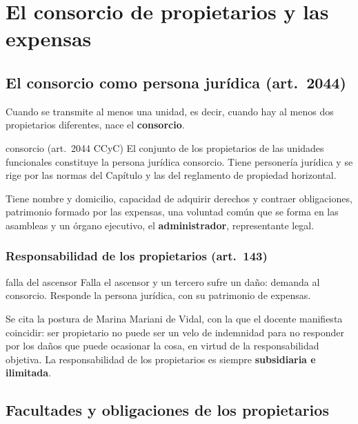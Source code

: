 \documentclass[12pt,oneside]{book}
\begin{document}
\chapter[El consorcio y las expensas]{El consorcio de propietarios y las expensas}\label{cap:consorcio}

\section{El consorcio como persona jurídica (art.~2044)}

Cuando se transmite al menos una unidad, es decir, cuando hay al menos dos propietarios diferentes, nace el \textbf{consorcio}.

\begin{definicion}{consorcio (art.~2044 CCyC)}
El conjunto de los propietarios de las unidades funcionales constituye la persona jurídica consorcio. Tiene personería jurídica y se rige por las normas del Capítulo y las del reglamento de propiedad horizontal.
\end{definicion}

Tiene nombre y domicilio, capacidad de adquirir derechos y contraer obligaciones, patrimonio formado por las expensas, una voluntad común que se forma en las asambleas y un órgano ejecutivo, el \textbf{administrador}, representante legal.

\subsection{Responsabilidad de los propietarios (art.~143)}

\begin{ejemplo}{falla del ascensor}
Falla el ascensor y un tercero sufre un daño: demanda al consorcio. Responde la persona jurídica, con su patrimonio de expensas.
\end{ejemplo}

Se cita la postura de Marina Mariani de Vidal, con la que el docente manifiesta coincidir: ser propietario no puede ser un velo de indemnidad para no responder por los daños que puede ocasionar la cosa, en virtud de la responsabilidad objetiva. La responsabilidad de los propietarios es siempre \textbf{subsidiaria e ilimitada}.

\section{Facultades y obligaciones de los propietarios}
\end{document}
